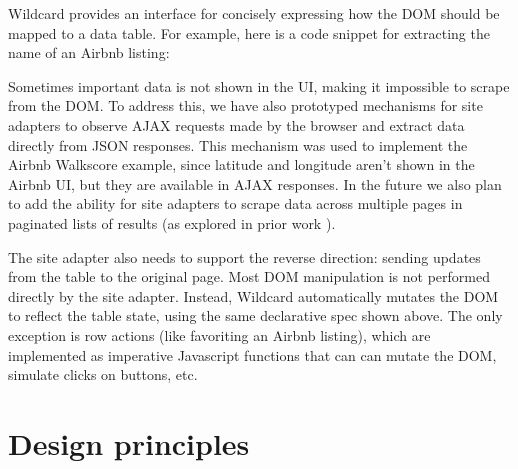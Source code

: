 \documentclass[english,submission]{programming}
\newenvironment{Shaded}{}{}
\newcommand{\CommentTok}[1]{\textcolor[rgb]{0.38,0.63,0.69}{\textit{#1}}}
\newcommand{\FunctionTok}[1]{\textcolor[rgb]{0.02,0.16,0.49}{#1}}
\newcommand{\KeywordTok}[1]{\textcolor[rgb]{0.00,0.44,0.13}{\textbf{#1}}}
\newcommand{\NormalTok}[1]{#1}
\newcommand{\OperatorTok}[1]{\textcolor[rgb]{0.40,0.40,0.40}{#1}}
\newcommand{\SpecialCharTok}[1]{\textcolor[rgb]{0.25,0.44,0.63}{#1}}
\newcommand{\StringTok}[1]{\textcolor[rgb]{0.25,0.44,0.63}{#1}}
\newcommand{\VariableTok}[1]{\textcolor[rgb]{0.10,0.09,0.49}{#1}}
\newcommand{\VerbatimStringTok}[1]{\textcolor[rgb]{0.25,0.44,0.63}{#1}}
\begin{document}
Wildcard provides an interface for concisely expressing how the DOM
should be mapped to a data table. For example, here is a code snippet
for extracting the name of an Airbnb listing:

\begin{Shaded}
\end{Shaded}

Sometimes important data is not shown in the UI, making it impossible to
scrape from the DOM. To address this, we have also prototyped mechanisms
for site adapters to observe AJAX requests made by the browser and
extract data directly from JSON responses. This mechanism was used to
implement the Airbnb Walkscore example, since latitude and longitude
aren't shown in the Airbnb UI, but they are available in AJAX responses.
In the future we also plan to add the ability for site adapters to
scrape data across multiple pages in paginated lists of results (as
explored in prior work \autocite{huynh2006}).

The site adapter also needs to support the reverse direction: sending
updates from the table to the original page. Most DOM manipulation is
not performed directly by the site adapter. Instead, Wildcard
automatically mutates the DOM to reflect the table state, using the same
declarative spec shown above. The only exception is row actions (like
favoriting an Airbnb listing), which are implemented as imperative
Javascript functions that can can mutate the DOM, simulate clicks on
buttons, etc.

\hypertarget{design-principles}{%
\section{Design principles}\label{design-principles}}
\end{document}
